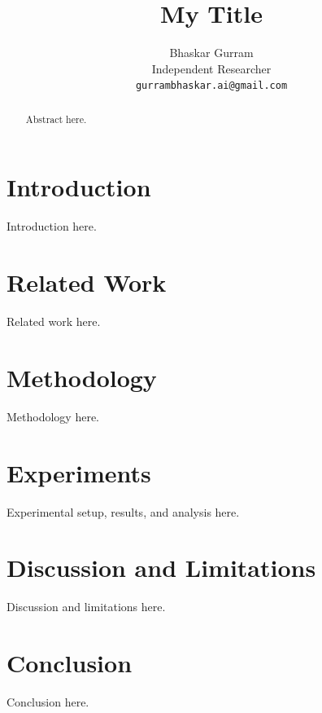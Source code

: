 \documentclass{article} %
\title{My Title}
\author{Bhaskar Gurram\\
Independent Researcher\\
\texttt{gurrambhaskar.ai@gmail.com}
}
\begin{document}
\maketitle

\begin{abstract}
Abstract here.
\end{abstract}

\section{Introduction}
\label{sec:intro}
Introduction here.

\section{Related Work}
\label{sec:related_work}
Related work here.

\section{Methodology}
\label{sec:method}
Methodology here.

\section{Experiments}
\label{sec:experiments}
Experimental setup, results, and analysis here.

\section{Discussion and Limitations}
\label{sec:discussion}
Discussion and limitations here.

\section{Conclusion}
\label{sec:conclusion}
Conclusion here.




\end{document}
